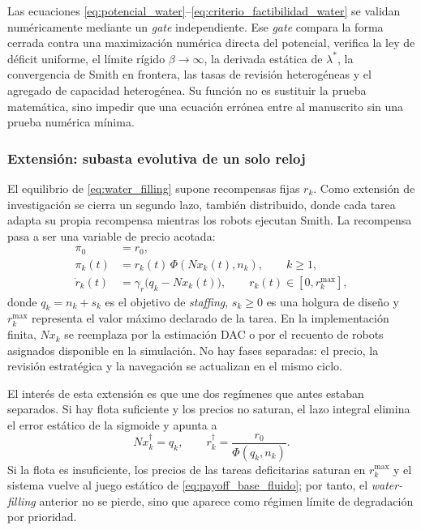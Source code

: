 Las ecuaciones \eqref{eq:potencial_water}--\eqref{eq:criterio_factibilidad_water} se
validan numéricamente mediante un \emph{gate} independiente.
Ese \emph{gate} compara la forma cerrada contra una maximización numérica directa del
potencial, verifica la ley de déficit uniforme, el límite rígido $\beta\to\infty$, la
derivada estática de $\lambda^*$, la convergencia de Smith en frontera, las tasas de
revisión heterogéneas y el agregado de capacidad heterogénea. Su función no es sustituir
la prueba matemática, sino impedir que una ecuación errónea entre al manuscrito sin una
prueba numérica mínima.

\subsubsection{Extensión: subasta evolutiva de un solo reloj}
\label{subsubsec:un_reloj}

El equilibrio de \eqref{eq:water_filling} supone recompensas fijas $r_k$. Como
extensión de investigación se cierra un segundo lazo, también distribuido, donde cada
tarea adapta su propia recompensa mientras los robots ejecutan Smith. La recompensa
pasa a ser una variable de precio acotada:
\begin{align}
  \pi_0 &= r_0, \label{eq:single_clock_idle}\\
  \pi_k(t) &= r_k(t)\,\Phi(Nx_k(t),n_k), \qquad k\ge 1, \label{eq:single_clock_payoff}\\
  \dot r_k(t) &= \gamma_r\bigl(q_k - Nx_k(t)\bigr),
  \qquad r_k(t)\in[0,r_k^{\max}], \label{eq:single_clock_price}
\end{align}
donde $q_k=n_k+s_k$ es el objetivo de \emph{staffing}, $s_k\ge0$ es una holgura de
diseño y $r_k^{\max}$ representa el valor máximo declarado de la tarea. En la
implementación finita, $Nx_k$ se reemplaza por la estimación DAC o por el recuento de
robots asignados disponible en la simulación. No hay fases separadas: el precio, la
revisión estratégica y la navegación se actualizan en el mismo ciclo.

El interés de esta extensión es que une dos regímenes que antes estaban separados. Si
hay flota suficiente y los precios no saturan, el lazo integral elimina el error estático
de la sigmoide y apunta a
\begin{equation}
  Nx_k^\dagger = q_k,\qquad
  r_k^\dagger = \frac{r_0}{\Phi(q_k,n_k)} .
  \label{eq:single_clock_exact_staffing}
\end{equation}
Si la flota es insuficiente, los precios de las tareas deficitarias saturan en
$r_k^{\max}$ y el sistema vuelve al juego estático de
\eqref{eq:payoff_base_fluido}; por tanto, el \emph{water-filling} anterior no se pierde,
sino que aparece como régimen límite de degradación por prioridad.

